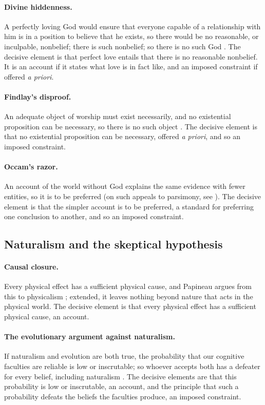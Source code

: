 \paragraph{Divine hiddenness.} A perfectly loving God would ensure that everyone capable of a
relationship with him is in a position to believe that he exists, so there would be no reasonable,
or inculpable, nonbelief; there is such nonbelief; so there is no such God \citep{schellenberg1993}.
The decisive element is that perfect love entails that there is no reasonable nonbelief. It is an
account if it states what love is in fact like, and an imposed constraint if offered
\emph{a priori}.

\paragraph{Findlay's disproof.} An adequate object of worship must exist necessarily, and no
existential proposition can be necessary, so there is no such object \citep{findlay1948}. The
decisive element is that no existential proposition can be necessary, offered \emph{a priori}, and
so an imposed constraint.

\paragraph{Occam's razor.} An account of the world without God explains the same evidence with fewer
entities, so it is to be preferred (on such appeals to parsimony, see \citealp{sober2015}). The
decisive element is that the simpler account is to be preferred, a standard for preferring one
conclusion to another, and so an imposed constraint.

\subsection{Naturalism and the skeptical hypothesis}\label{ss:arguments-naturalism}

\paragraph{Causal closure.} Every physical effect has a sufficient physical cause, and Papineau
argues from this to physicalism \citep{papineau2001}; extended, it leaves nothing beyond nature that
acts in the physical world. The decisive element is that every physical effect has a sufficient
physical cause, an account.

\paragraph{The evolutionary argument against naturalism.} If naturalism and evolution are both true,
the probability that our cognitive faculties are reliable is low or inscrutable; so whoever accepts
both has a defeater for every belief, including naturalism \citep[ch.~12]{plantinga1993}. The
decisive elements are that this probability is low or inscrutable, an account, and the principle
that such a probability defeats the beliefs the faculties produce, an imposed constraint.


